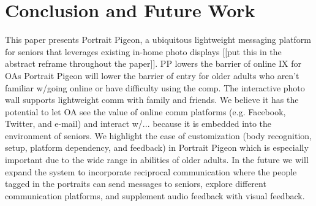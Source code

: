 \documentclass{chi-ext}
\begin{document}
\section{Conclusion and Future Work}
This paper presents Portrait Pigeon, a ubiquitous lightweight messaging platform for seniors that leverages existing in-home photo displays [[put this in the abstract  reframe throughout the paper]]. PP lowers the barrier of online IX for OAs 
Portrait Pigeon will lower the barrier of entry for older adults who aren't familiar w/going online or have difficulty using the comp. The interactive photo wall supports lightweight comm with family and friends. We believe it has the potential to let OA see the value of online comm platforms (e.g. Facebook, Twitter, and e-mail) and interact w/... because it is embedded into the environment of seniors.  We highlight the ease of customization (body recognition, setup, platform dependency, and feedback) in Portrait Pigeon which is especially important due to the wide range in abilities of older adults. In the future we will expand the system to incorporate reciprocal communication where the people tagged in the portraits can send messages to seniors, explore different communication platforms, and supplement audio feedback with visual feedback.	

\balance


\end{document}
